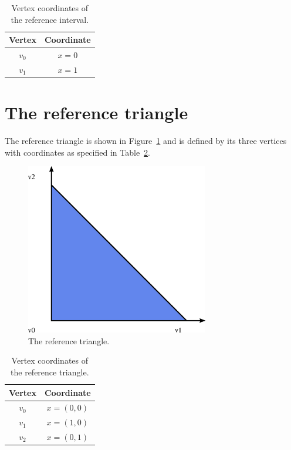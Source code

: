\begin{table}[H]
\linespread{1.2}\selectfont
  \begin{center}
    \begin{tabular}{|c|c|}
      \hline
      Vertex & Coordinate \\
      \hline
      \hline
      $v_0$ & $x = 0$ \\
      \hline
      $v_1$ & $x = 1$ \\
      \hline
    \end{tabular}
    \caption{Vertex coordinates of the reference interval.}
    \label{tab:interval,vertices}
  \end{center}
\end{table}

\newpage
\section{The reference triangle}

The reference triangle is shown in Figure~\ref{fig:triangle} and is
defined by its three vertices with coordinates as specified in
Table~\ref{tab:triangle,vertices}.

\begin{figure}[H]
  \begin{center}
    \includegraphics[width=8cm]{eps/triangle.eps}
    \caption{The reference triangle.}
    \label{fig:triangle}
  \end{center}
\end{figure}

\begin{table}[H]
\linespread{1.2}\selectfont
  \begin{center}
    \begin{tabular}{|c|c|}
      \hline
      Vertex & Coordinate \\
      \hline
      \hline
      $v_0$ & $x = (0, 0)$ \\
      \hline
      $v_1$ & $x = (1, 0)$ \\
      \hline
      $v_2$ & $x = (0, 1)$ \\
      \hline
    \end{tabular}
    \caption{Vertex coordinates of the reference triangle.}
    \label{tab:triangle,vertices}
  \end{center}
\end{table}

